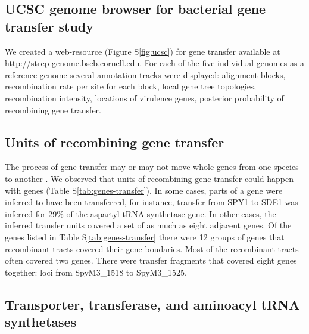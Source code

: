 \documentclass[english]{article}
\begin{document}
\subsection{UCSC genome browser for bacterial gene transfer study}

We created a web-resource (Figure S\ref{fig:ucsc}) for gene transfer available at
\url{http://strep-genome.bscb.cornell.edu}.  For each of the five individual
genomes as a reference genome several annotation tracks were displayed:
alignment blocks, recombination rate per site for each block, local gene tree
topologies, recombination intensity, locations of virulence genes, posterior
probability of recombining gene transfer.  

\subsection{Units of recombining gene transfer}

The process of gene transfer may or may not move whole genes from one species to
another \citep[e.g.,][]{Chan2009}. We observed that units of recombining gene
transfer could happen with genes (Table S\ref{tab:genes-transfer}). In some
cases, parts of a gene were inferred to have been transferred, for instance,
transfer from SPY1 to SDE1 was inferred for 29\% of the aspartyl-tRNA synthetase
gene.  In other cases, the inferred transfer units covered a set of as much as
eight adjacent genes.  Of the genes listed in Table S\ref{tab:genes-transfer}
there were 12 groups of genes that recombinant tracts covered their gene
boudaries.  Most of the recombinant tracts often covered two genes. There were
transfer fragments that covered eight genes together: loci from SpyM3\_1518 to
SpyM3\_1525.

\subsection{Transporter, transferase, and aminoacyl tRNA synthetases}
\end{document}
